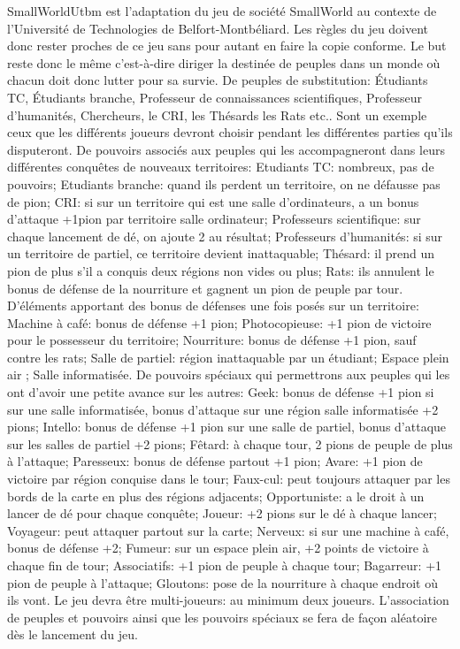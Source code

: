 \documentclass[a4paper, 11pt]{article}
\begin{document}
	
	SmallWorldUtbm est l'adaptation du jeu de société SmallWorld au contexte de l'Université de Technologies de Belfort-Montbéliard. Les règles du jeu doivent donc rester proches de ce jeu sans pour autant en faire la copie conforme. Le but reste donc le même c'est-à-dire diriger la destinée de peuples dans un monde où chacun doit donc lutter pour sa survie. 
De peuples de substitution: 
Étudiants TC, Étudiants branche, Professeur de connaissances scientifiques, Professeur d’humanités, Chercheurs, le CRI, les Thésards les Rats etc.. Sont un exemple ceux que les différents joueurs devront choisir pendant les différentes parties qu'ils disputeront.
De pouvoirs associés aux peuples qui les accompagneront dans leurs différentes conquêtes de nouveaux territoires: 
Etudiants TC: nombreux, pas de pouvoirs;
Etudiants branche: quand ils perdent un territoire, on ne défausse pas de pion;
CRI: si sur un territoire qui est une salle d’ordinateurs, a un bonus d’attaque +1pion par territoire salle ordinateur;
Professeurs scientifique: sur chaque lancement de dé, on ajoute 2 au résultat;
Professeurs d’humanités: si sur un territoire de partiel, ce territoire devient inattaquable;
Thésard: il prend un pion de plus s’il a conquis deux régions non vides ou plus;
Rats: ils annulent le bonus de défense de la nourriture et gagnent un pion de peuple par tour.
D'éléments apportant des bonus de défenses une fois posés sur un territoire:
Machine à café: bonus de défense +1 pion; 
Photocopieuse: +1 pion de victoire pour le possesseur du territoire;
Nourriture: bonus de défense +1 pion, sauf contre les rats;
Salle de partiel: région inattaquable par un étudiant;
Espace plein air ;
Salle informatisée.
De pouvoirs spéciaux qui permettrons aux peuples qui les ont d'avoir une petite avance sur les autres:
Geek: bonus de défense +1 pion si sur une salle informatisée, bonus d’attaque sur une région salle informatisée +2 pions;
Intello: bonus de défense +1 pion sur une salle de partiel, bonus d’attaque sur les salles de partiel +2 pions;
Fêtard: à chaque tour, 2 pions de peuple de plus à l’attaque;
Paresseux: bonus de défense partout +1 pion;
Avare: +1 pion de victoire par région conquise dans le tour;
Faux-cul: peut toujours attaquer par les bords de la carte en plus des régions adjacents;
Opportuniste: a le droit à un lancer de dé pour chaque conquête;
Joueur: +2 pions sur le dé à chaque lancer;
Voyageur: peut attaquer partout sur la carte;
Nerveux: si sur une machine à café, bonus de défense +2;
Fumeur: sur un espace plein air, +2 points de victoire à chaque fin de tour;
Associatifs: +1 pion de peuple à chaque tour;
Bagarreur: +1 pion de peuple à l’attaque;
Gloutons: pose de la nourriture à chaque endroit où ils vont.
Le jeu devra être multi-joueurs: au minimum deux joueurs. L'association de peuples et pouvoirs ainsi que les pouvoirs spéciaux se fera de façon aléatoire dès le lancement du jeu.



	
\end{document}
